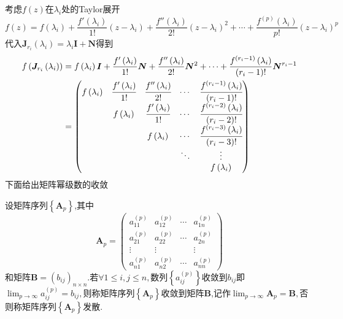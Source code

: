 考虑$f\left(z\right)$在$\lambda_i$处的Taylor展开\[
f\left(z\right)=f\left(\lambda_i\right)+\frac{f'\left(\lambda_i\right)}{1!}\left(z-\lambda_i\right)+\frac{f''\left(\lambda_i\right)}{2!}\left(z-\lambda_i\right)^2+\cdots+\frac{
    f^{\left(p\right)}\left(\lambda_i\right)
}{p!}\left(z-\lambda_i\right)^p
\]代入$\bm{J}_{r_i}\left(\lambda_i\right)=\lambda_i\bm{I}+\bm{N}$得到\begin{align*}
    f\left(
        \bm{J}_{r_i}\left(
        \lambda_i
        \right)
    \right)&=f\left(\lambda_i\right)\bm{I}+\frac{f'\left(\lambda_i\right)}{1!}\bm{N}+\frac{f''\left(\lambda_i\right)}{2!}\bm{N}^2+\cdots+\frac{
        f^{\left(r_i-1\right)}\left(\lambda_i\right)
    }{\left(r_i-1\right)!}\bm{N}^{r_i-1}\\
    &=\begin{pmatrix}
        f\left(\lambda_i\right)&\cfrac{f'\left(\lambda_i\right)}{1!}&\cfrac{f''\left(\lambda_i\right)}{2!}&\cdots&\cfrac{f^{\left(r_i-1\right)}\left(\lambda_i\right)}{\left(r_i-1\right)!}\\
        &f\left(\lambda_i\right)&\cfrac{f'\left(\lambda_i\right)}{1!}&\cdots&\cfrac{f^{\left(r_i-2\right)}\left(\lambda_i\right)}{\left(r_i-2\right)!}\\
        &&f\left(\lambda_i\right)&\cdots&\cfrac{f^{\left(r_i-3\right)}\left(\lambda_i\right)}{\left(r_i-3\right)!}\\
        &&&\ddots&\vdots\\
        &&&&f\left(\lambda_i\right)
    \end{pmatrix}
\end{align*}
下面给出矩阵幂级数的收敛\begin{formal}
    \begin{definition}[矩阵幂级数收敛的定义]\label{def:矩阵幂级数收敛的定义}
        设矩阵序列$\left\{\bm{A}_p\right\}$,其中\[
        \bm{A}_p=\begin{pmatrix}
            a_{11}^{\left(p\right)}&a_{12}^{\left(p\right)}&\cdots&a_{1n}^{\left(p\right)}\\
            a_{21}^{\left(p\right)}&a_{22}^{\left(p\right)}&\cdots&a_{2n}^{\left(p\right)}\\
            \vdots&\vdots&&\vdots\\
            a_{n1}^{\left(p\right)}&a_{n2}^{\left(p\right)}&\cdots&a_{nn}^{\left(p\right)}
        \end{pmatrix}
        \]和矩阵$\bm{B}=\left(b_{ij}\right)_{n\times n}.$若$\forall 1\leqslant i,j\leqslant n,$数列$\left\{
            a_{ij}^{\left(p\right)}
        \right\}$收敛到$b_{ij}$即$\displaystyle \lim_{p\to\infty}a_{ij}^{\left(p\right)}=b_{ij},$则称矩阵序列$\left\{\bm{A}_p\right\}$收敛到矩阵$\bm{B}$,记作$\displaystyle \lim_{p\to\infty}\bm{A}_p=\bm{B},$否则称矩阵序列$\left\{\bm{A}_p\right\}$发散.
    \end{definition}
\end{formal}

